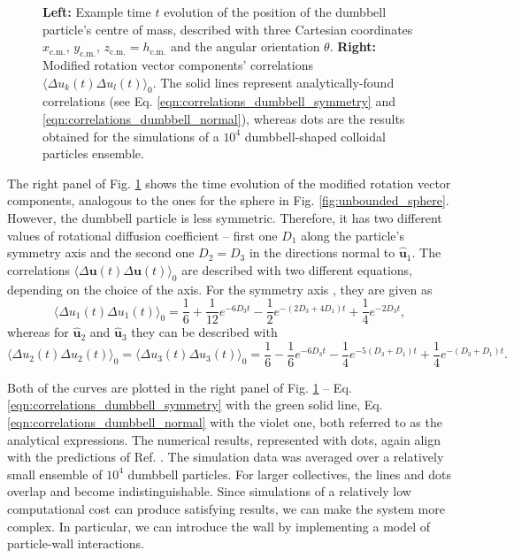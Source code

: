 \documentclass{master_thesis}
\begin{document}
\begin{figure}
    \centering
    
    \caption{\textbf{Left:} Example time $t$ evolution of the position of the dumbbell particle's centre of mass, described with three Cartesian coordinates $x_{\textrm{c.m.}}$, $y_{\textrm{c.m.}}$, $z_{\textrm{c.m.}}=h_{\textrm{c.m.}}$ and the angular orientation $\theta$. \textbf{Right:} Modified rotation vector components' correlations $\langle \Delta u_k (t) \Delta u_l (t) \rangle_0$. The solid lines represent analytically-found correlations (see Eq. \eqref{eqn:correlations_dumbbell_symmetry} and \eqref{eqn:correlations_dumbbell_normal}), whereas dots are the results obtained for the simulations of a $10^4$ dumbbell-shaped colloidal particles ensemble.}
    \label{fig:unbounded_dumbbell}
\end{figure}

The right panel of Fig. \ref{fig:unbounded_dumbbell} shows the time evolution of the modified rotation vector components, analogous to the ones for the sphere in Fig. \ref{fig:unbounded_sphere}. However, the dumbbell particle is less symmetric. Therefore, it has two different values of rotational diffusion coefficient -- first one $D_1$ along the particle's symmetry axis and the second one $D_2=D_3$ in the directions normal to $\hat{\boldsymbol{u}}_1$. The correlations $\langle \Delta \bm{u} (t) \Delta \bm{u} (t) \rangle_{0}$ are described with two different equations, depending on the choice of the axis. For the symmetry axis \cite{cichocki2015}, they are given as
\begin{equation}
    \langle \Delta u_1(t) \Delta u_1(t) \rangle_{0} = \frac{1}{6} + \frac{1}{12}e^{-6 D_3 t} - \frac{1}{2}e^{-(2 D_3 + 4 D_1)t} + \frac{1}{4}e^{-2 D_3 t},
\label{eqn:correlations_dumbbell_symmetry}
\end{equation}
whereas for $\hat{\boldsymbol{u}}_2$ and $\hat{\boldsymbol{u}}_3$ \cite{cichocki2015} they can be described with
\begin{equation}
    \langle \Delta u_2(t) \Delta u_2(t) \rangle_{0} = \langle \Delta u_3 (t) \Delta u_3 (t) \rangle_{0} = \frac{1}{6} - \frac{1}{6}e^{-6 D_3 t} - \frac{1}{4}e^{-5(D_3 + D_1)t} + \frac{1}{4}e^{-(D_3 + D_1)t}.
\label{eqn:correlations_dumbbell_normal}
\end{equation}

Both of the curves are plotted in the right panel of Fig. \ref{fig:unbounded_dumbbell} -- Eq. \eqref{eqn:correlations_dumbbell_symmetry} with the green solid line, Eq. \eqref{eqn:correlations_dumbbell_normal} with the violet one, both referred to as the analytical expressions. The numerical results, represented with dots, again align with the predictions of Ref. \cite{cichocki2015}. The simulation data was averaged over a relatively small ensemble of $10^4$ dumbbell particles. For larger collectives, the lines and dots overlap and become indistinguishable. Since simulations of a relatively low computational cost can produce satisfying results, we can make the system more complex. In particular, we can introduce the wall by implementing a model of particle-wall interactions.
\end{document}
